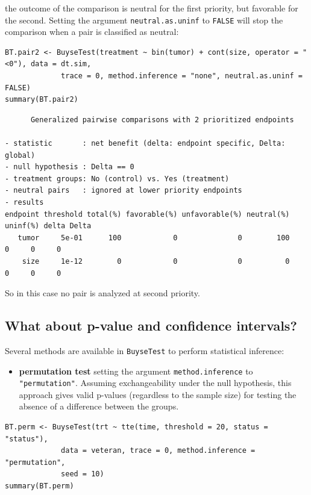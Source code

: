 \documentclass[12pt]{article}
\begin{document}
the outcome of the comparison is neutral for the first priority, but
favorable for the second. Setting the argument \texttt{neutral.as.uninf} to
\texttt{FALSE} will stop the comparison when a pair is classified as neutral:
\lstset{language=r,label= ,caption= ,captionpos=b,numbers=none}
\begin{lstlisting}
BT.pair2 <- BuyseTest(treatment ~ bin(tumor) + cont(size, operator = "<0"), data = dt.sim,
		     trace = 0, method.inference = "none", neutral.as.uninf = FALSE)
summary(BT.pair2)
\end{lstlisting}

\begin{verbatim}
      Generalized pairwise comparisons with 2 prioritized endpoints

- statistic       : net benefit (delta: endpoint specific, Delta: global) 
- null hypothesis : Delta == 0 
- treatment groups: No (control) vs. Yes (treatment) 
- neutral pairs   : ignored at lower priority endpoints
- results
endpoint threshold total(%) favorable(%) unfavorable(%) neutral(%) uninf(%) delta Delta
   tumor     5e-01      100            0              0        100        0     0     0
    size     1e-12        0            0              0          0        0     0     0
\end{verbatim}

So in this case no pair is analyzed at second priority.

\clearpage

\subsection{What about p-value and confidence intervals?}
\label{sec:org016aec8}

Several methods are available in \texttt{BuyseTest} to perform statistical inference:
\begin{itemize}
\item \textbf{permutation test} setting the argument \texttt{method.inference} to
\texttt{"permutation"}. Assuming exchangeability under the null hypothesis,
this approach gives valid p-values (regardless to the sample size)
for testing the absence of a difference between the groups.
\end{itemize}
\lstset{language=r,label= ,caption= ,captionpos=b,numbers=none}
\begin{lstlisting}
BT.perm <- BuyseTest(trt ~ tte(time, threshold = 20, status = "status"),
		     data = veteran, trace = 0, method.inference = "permutation",
		     seed = 10) 
summary(BT.perm)
\end{lstlisting}
\end{document}
